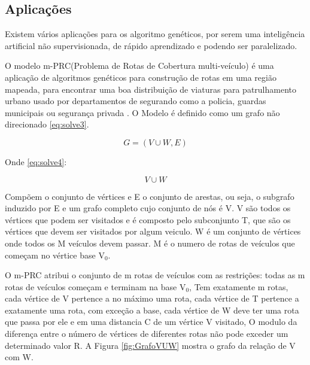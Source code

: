 \subsection{Aplicações}
Existem vários aplicações para os algoritmo genéticos, por serem uma inteligência artificial não supervisionada, de rápido aprendizado e podendo ser paralelizado.

O modelo m-PRC(Problema de Rotas de Cobertura multi-veículo) é uma aplicação de algoritmos genéticos para construção de rotas em uma região mapeada, para encontrar uma boa distribuição de viaturas para patrulhamento urbano usado por departamentos de segurando como a policia, guardas municipais ou segurança privada \cite{Washington}. 
O Modelo é definido como um grafo não direcionado \ref{eq:solve3}. 

\begin{equation} \label{eq:solve3}
G=(V\cup W, E)
\end{equation}

Onde \ref{eq:solve4}: 

\begin{equation} \label{eq:solve4}
V\cup W
\end{equation}

Compõem o conjunto de vértices e E o conjunto de arestas, ou seja, o subgrafo induzido por E e um grafo completo cujo conjunto de nós é V. 
V são todos os vértices que podem ser visitados e é composto pelo subconjunto T, que são os vértices que devem ser visitados por algum veiculo. W é um conjunto de vértices onde todos os M veículos devem passar. M é o numero de rotas de veículos que começam no vértice base V$_0$. 

O m-PRC atribui o conjunto de m rotas de veículos com as restrições: todas as m rotas de veículos começam e terminam na base V$_0$, Tem exatamente m rotas, cada vértice de V pertence a no máximo uma rota, cada vértice de T pertence a exatamente uma rota, com exceção a base, cada vértice de W deve ter uma rota que passa por ele e em uma distancia C de um vértice V visitado, O modulo da diferença entre o número de vértices de diferentes rotas não pode exceder um determinado valor R. A Figura \ref{fig:GrafoVUW} mostra o grafo da relação de V com W.

\begin{minipage}{\linewidth}
    \label{fig:GrafoVUW}
\end{minipage}

